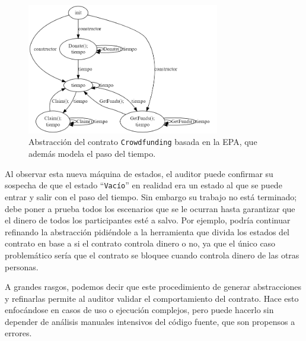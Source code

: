 \begin{figure}[h]
    \centering
    \includegraphics[width=0.75\textwidth]{figs/crowdfunding-time-epa.png}
    \caption{Abstracción del contrato \texttt{Crowdfunding} basada en la EPA, que además modela el paso del tiempo.}
    \label{fig:crowdfunding-time-epa}
\end{figure}

Al observar esta nueva máquina de estados, el auditor puede confirmar su sospecha de que el estado ``\texttt{Vacío}'' en realidad era un estado al que se puede entrar y salir con el paso del tiempo.
Sin embargo su trabajo no está terminado; debe poner a prueba todos los escenarios que se le ocurran hasta garantizar que el dinero de todos los participantes esté a salvo.
Por ejemplo, podría continuar refinando la abstracción pidiéndole a la herramienta que divida los estados del contrato en base a si el contrato controla dinero o no, ya que el único caso problemático sería que el contrato se bloquee cuando controla dinero de las otras personas.

A grandes rasgos, podemos decir que este procedimiento de generar abstracciones y refinarlas permite al auditor validar el comportamiento del contrato.
Hace esto enfocándose en casos de uso o ejecución complejos, pero puede hacerlo sin depender de análisis manuales intensivos del código fuente, que son propensos a errores.

